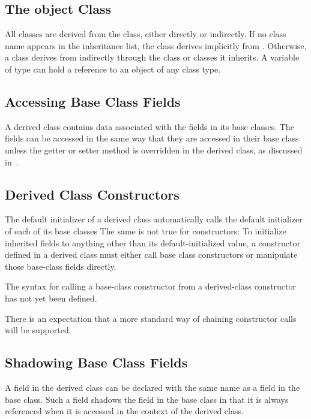 \subsection{The object Class}
\label{The_object_Class}

All classes are derived from the  class, either directly or
indirectly.  If no class name appears in the inheritance list, the class derives
implicitly from .  Otherwise, a class derives from 
indirectly through the class or classes it inherits.  A variable of type 
can hold a reference to an object of any class type. 

\subsection{Accessing Base Class Fields}
\label{Accessing_Base_Class_Fields}

A derived class contains data associated with the fields in its base
classes.  The fields can be accessed in the same way that they are
accessed in their base class unless the getter or setter method is
overridden in the derived class, as discussed
in~.

\subsection{Derived Class Constructors}
\label{Derived_Class_Constructors}

The default initializer of a derived class automatically calls the default
initializer of each of its base classes %
The same is not true for constructors:
To initialize inherited fields to anything other than its default-initialized
value, a constructor defined in a derived class must either call base class
constructors or manipulate those base-class fields directly.

\begin{openissue}
The syntax for calling a base-class constructor from a derived-class constructor
has not yet been defined.

There is an expectation that a more standard way
of chaining constructor calls will be supported.
\end{openissue}

\subsection{Shadowing Base Class Fields}
\label{Shadowing_Base_Class_Fields}
A field in the derived class can be declared with the same name as a
field in the base class.  Such a field shadows the field in the base
class in that it is always referenced when it is accessed in the
context of the derived class.  

